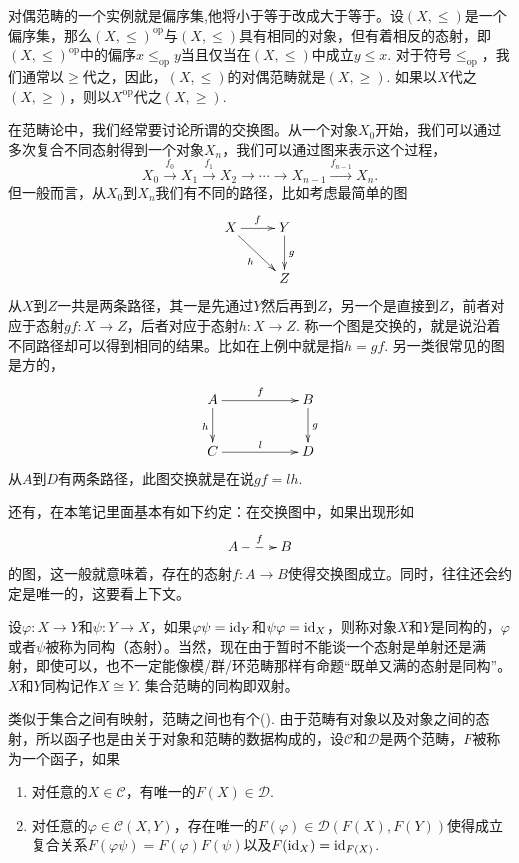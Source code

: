 对偶范畴的一个实例就是偏序集,他将小于等于改成大于等于。设$(X,\leq)$是一个偏序集，那么$(X,\leq)^\text{op}$与$(X,\leq)$具有相同的对象，但有着相反的态射，即$(X,\leq)^\text{op}$中的偏序$x\leq_{\text{op}} y$当且仅当在$(X,\leq)$中成立$y\leq x$. 对于符号$\leq_{\text{op}}$，我们通常以$\geq$代之，因此，$(X,\leq)$的对偶范畴就是$(X,\geq)$. 如果以$X$代之$(X,\geq)$，则以$X^{\text{op}}$代之$(X,\geq)$.

\para[交换图] 在范畴论中，我们经常要讨论所谓的交换图。从一个对象$X_0$开始，我们可以通过多次复合不同态射得到一个对象$X_n$，我们可以通过图来表示这个过程，
\[
	X_0\xrightarrow{f_0} X_1\xrightarrow{f_1} X_2\to\cdots\to X_{n-1}\xrightarrow{f_{n-1}} X_n.
\]
但一般而言，从$X_0$到$X_n$我们有不同的路径，比如考虑最简单的图
\[
\begin{xy}
	\xymatrix{
		X\ar[r]^{f} \ar[dr]_{h}&Y \ar[d]^{g}\\
		&Z
	}
\end{xy}
\]
从$X$到$Z$一共是两条路径，其一是先通过$Y$然后再到$Z$，另一个是直接到$Z$，前者对应于态射$gf:X\to Z$，后者对应于态射$h:X\to Z$. 称一个图是交换的，就是说沿着不同路径却可以得到相同的结果。比如在上例中就是指$h=gf$. 另一类很常见的图是方的，
\[
\begin{xy}
	\xymatrix{
		A\ar[rr]^{f} \ar[d]_{h}&&B \ar[d]^{g}\\
		C\ar[rr]^{l}&&D
	}
\end{xy}
\]
从$A$到$D$有两条路径，此图交换就是在说$gf=lh$. 

还有，在本笔记里面基本有如下约定：在交换图中，如果出现形如
\[
\begin{xy}
	\xymatrix{
		A\ar@{-->}[r]^{f}&B
	}
\end{xy}
\]
的图，这一般就意味着，存在的态射$f:A\to B$使得交换图成立。同时，往往还会约定是唯一的，这要看上下文。

\para[同构] 设$\varphi:X\to Y$和$\psi:Y\to X$，如果$\varphi\psi=\operatorname{id}_Y$和$\psi\varphi=\operatorname{id}_X$，则称对象$X$和$Y$是同构的，$\varphi$或者$\psi$被称为同构（态射）。当然，现在由于暂时不能谈一个态射是单射还是满射，即使可以，也不一定能像模/群/环范畴那样有命题“既单又满的态射是同构”。$X$和$Y$同构记作$X\cong Y$. 集合范畴的同构即双射。

\para[函子] 类似于集合之间有映射，范畴之间也有个(). 由于范畴有对象以及对象之间的态射，所以函子也是由关于对象和范畴的数据构成的，设$\mathcal{C}$和$\mathcal{D}$是两个范畴，$F$被称为一个函子，如果
\begin{enumerate}
	\item 对任意的$X\in \mathcal{C}$，有唯一的$F(X)\in \mathcal{D}$.
	
	\item 对任意的$\varphi\in \mathcal{C}(X,Y)$，存在唯一的$F(\varphi)\in  \mathcal{D}(F(X),F(Y))$使得成立复合关系$F(\varphi\psi)=F(\varphi)F(\psi)$以及$F(\operatorname{id}_X)=\operatorname{id}_{F(X)}$.
\end{enumerate}

